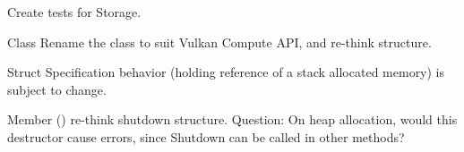 \begin{DoxyRefList}
Create tests for Storage. 
\item[Class \doxylink{class_renderer_1_1_renderer}{Renderer\+::Renderer} ]\label{todo__todo000015}%
%
Rename the class to suit Vulkan Compute API, and re-\/think structure.  
\item[Struct \doxylink{struct_renderer_1_1_renderer_specification}{Renderer\+::Renderer\+Specification} ]\label{todo__todo000014}%
%
Specification behavior (holding reference of a stack allocated memory) is subject to change.  
\item[Member \doxylink{class_renderer_1_1_window_a884079fea19cb003aa37a8be5058bfbc}{Renderer\+::Window\+::\texorpdfstring{$\sim$}{\string~}\+Window} ()]\label{todo__todo000016}%
%
re-\/think shutdown structure. Question\+: On heap allocation, would this destructor cause errors, since Shutdown can be called in other methods? 
\end{DoxyRefList}